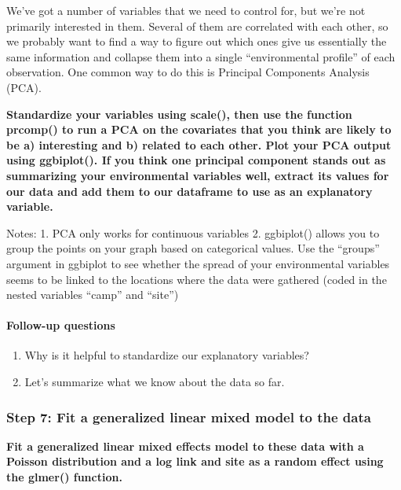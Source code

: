 \documentclass[]{article}
\providecommand{\tightlist}{%
  \setlength{\itemsep}{0pt}\setlength{\parskip}{0pt}}
\let\oldparagraph\paragraph
\renewcommand{\paragraph}[1]{\oldparagraph{#1}\mbox{}}
\begin{document}
We've got a number of variables that we need to control for, but we're
not primarily interested in them. Several of them are correlated with
each other, so we probably want to find a way to figure out which ones
give us essentially the same information and collapse them into a single
``environmental profile'' of each observation. One common way to do this
is Principal Components Analysis (PCA).

\textbf{Standardize your variables using scale(), then use the function
prcomp() to run a PCA on the covariates that you think are likely to be
a) interesting and b) related to each other. Plot your PCA output using
ggbiplot(). If you think one principal component stands out as
summarizing your environmental variables well, extract its values for
our data and add them to our dataframe to use as an explanatory
variable.}

Notes: 1. PCA only works for continuous variables 2. ggbiplot() allows
you to group the points on your graph based on categorical values. Use
the ``groups'' argument in ggbiplot to see whether the spread of your
environmental variables seems to be linked to the locations where the
data were gathered (coded in the nested variables ``camp'' and ``site'')

\hypertarget{follow-up-questions-2}{%
\paragraph{Follow-up questions}\label{follow-up-questions-2}}

\begin{enumerate}
\def\labelenumi{\arabic{enumi}.}
\tightlist
\item
  Why is it helpful to standardize our explanatory variables?
\item
  Let's summarize what we know about the data so far.
\end{enumerate}

\hypertarget{step-7-fit-a-generalized-linear-mixed-model-to-the-data}{%
\subsubsection{Step 7: Fit a generalized linear mixed model to the
data}\label{step-7-fit-a-generalized-linear-mixed-model-to-the-data}}

\textbf{Fit a generalized linear mixed effects model to these data with
a Poisson distribution and a log link and site as a random effect using
the glmer() function.}
\end{document}
